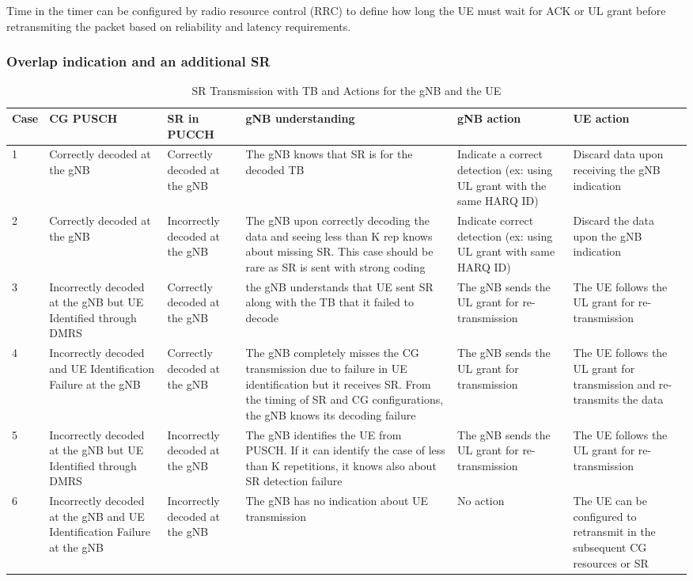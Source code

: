 \documentclass{ieeeaccess}
\begin{document}
Time in the timer can be configured by radio resource control (RRC) to define how long the UE must wait for ACK or UL grant before retransmiting the packet based on reliability and latency requirements.

\subsubsection{Overlap indication and an additional SR}\label{IIB3}

\begin{table}[htbp]
\caption{SR Transmission with TB and Actions for the gNB and the UE}
\begin{center}
\begin{tabular}{|p{1.5em}|p{10em}|p{9em}|p{16em}|p{9em}|p{9em}|}
 \hline
 \textbf{Case} & \textbf{CG PUSCH} & \textbf{SR in PUCCH} & \textbf{gNB understanding} & \textbf{gNB action} & \textbf{UE action}\\ 
 \hline
 1 & Correctly decoded at the gNB & Correctly decoded at the gNB & The gNB knows that SR is for the decoded TB & Indicate a correct detection (ex: using UL grant with the same HARQ ID) & Discard data upon receiving the gNB indication\\
 \hline
 2 &  Correctly decoded at the gNB & Incorrectly decoded at the gNB & The gNB upon correctly decoding the data and seeing less than K rep knows about missing SR. This case should be rare as SR is sent with strong coding & Indicate correct detection (ex: using UL grant with same HARQ ID) & Discard the data upon the gNB indication\\
\hline
3 & Incorrectly decoded at the gNB but UE Identified through DMRS & Correctly decoded at the gNB & the gNB understands that UE sent SR along with the TB that it failed to decode & The gNB sends the UL grant for re-transmission & The UE follows the UL grant for re-transmission\\
\hline
4 & Incorrectly decoded and UE Identification Failure at the gNB & Correctly decoded at the gNB & The gNB completely misses the CG transmission due to failure in UE identification but it receives SR. From the timing of SR and CG configurations, the gNB knows its decoding failure & The gNB sends the UL grant for transmission & The UE follows the UL grant for transmission and re-transmits the data\\
\hline
5 & Incorrectly decoded at the gNB but UE Identified through DMRS & Incorrectly decoded at the gNB & The gNB identifies the UE from PUSCH. If it can identify the case of less than K repetitions, it knows also about SR detection failure & The gNB sends the UL grant for re-transmission & The UE follows the UL grant for re-transmission\\
\hline
 6 & Incorrectly decoded at the gNB and UE Identification Failure at the gNB & Incorrectly decoded at the gNB & The gNB has no indication about UE transmission & No action & The UE can be configured to
retransmit in the subsequent CG resources or SR\\
 


\end{tabular}
\end{center}
\end{table}
\end{document}
